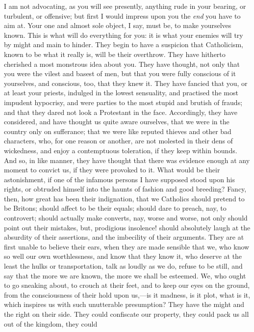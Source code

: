I am not advocating, as you will see presently,
anything rude in your bearing, or turbulent, or
offensive; but first I would impress upon you the \emph{end}
you have to aim at. Your one and almost sole object, I
say, must be, to make yourselves known. This is what will
do everything for you: it is what your enemies will try
by might and main to hinder. They begin to have a
suspicion that Catholicism, known to be what it really
is, will be their overthrow. They have hitherto cherished
a most monstrous idea about you. They have thought, not
only that you were the vilest and basest of men, but that
you were fully conscious of it yourselves, and conscious,
too, that they knew it. They have fancied that you, or at
least your priests, indulged in the lowest sensuality,
and practised the most impudent hypocrisy, and were
parties to the most stupid and brutish of frauds; and
that they dared not look a Protestant in the face.
Accordingly, they have considered, and have thought us
quite aware ourselves, that we were in the country only
on sufferance; that we were like reputed thieves and
other bad characters, who, for one reason or another, are
not molested in their dens of wickedness, and enjoy a
contemptuous toleration, if they keep within bounds. And
so, in like manner, they have thought that there was
evidence enough at any moment to convict us, if they were
provoked to it. What would be their astonishment, if one
of the infamous persons I have supposed stood upon his
rights, or obtruded himself into the haunts of fashion
and good breeding? Fancy, then, how great has been their
indignation, that we Catholics should pretend to be
Britons; should affect to be their equals; should dare to
preach, nay, to controvert; should actually make
converts, nay, worse and worse, not only should point out
their mistakes, but, prodigious insolence! should
absolutely laugh at the absurdity of their assertions,
and the imbecility of their arguments. They are at first
unable to believe their ears, when they are made sensible
that we, who know so well our own worthlessness, and know
that they know it, who deserve at the least the hulks or
transportation, talk as loudly as we do, refuse to be
still, and say that the more we are known, the more we
shall be esteemed. We, who ought to go sneaking about, to
crouch at their feet, and to keep our eyes on the ground,
from the consciousness of their hold upon us,—is it
madness, is it plot, what is it, which inspires us with
such unutterable presumption? They have the might and the
right on their side. They could confiscate our property,
they could pack us all out of the kingdom, they could
